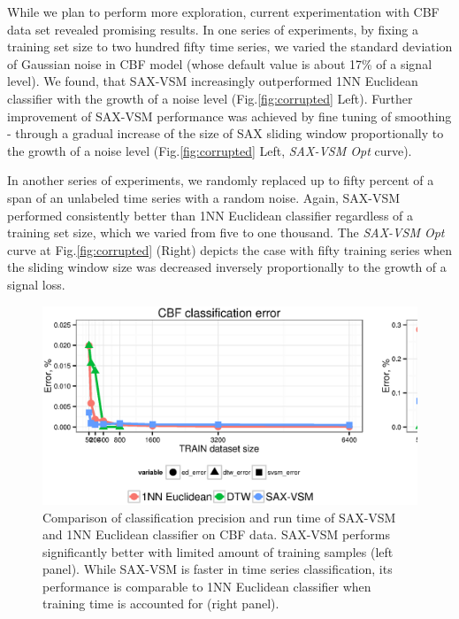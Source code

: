 While we plan to perform more exploration, current experimentation with CBF data set revealed 
promising results. 
In one series of experiments, by fixing a training set size to two hundred fifty time series, we
varied the standard deviation of Gaussian noise in CBF model (whose default value is about 
17\% of a signal level). We found, that SAX-VSM increasingly outperformed 1NN Euclidean classifier 
with the growth of a noise level (Fig.\ref{fig:corrupted} Left). 
Further improvement of SAX-VSM performance was achieved by fine tuning of smoothing - 
through a gradual increase of the size of SAX sliding window proportionally to the growth of 
a noise level (Fig.\ref{fig:corrupted} Left, \textit{SAX-VSM Opt} curve). 

In another series of experiments, we randomly replaced up to fifty percent of a span of an 
unlabeled time series with a random noise. 
Again, SAX-VSM performed consistently better than 1NN Euclidean classifier regardless of a 
training set size, which we varied from five to one thousand. 
The \textit{SAX-VSM Opt} curve at Fig.\ref{fig:corrupted} (Right) depicts the case
with fifty training series when the sliding window size was decreased inversely proportionally 
to the growth of a signal loss.


\begin{figure}[t]
   \centering
   \includegraphics[width=140mm]{figures/precision-synt.ps}
   \caption{Comparison of classification precision and run time of SAX-VSM and 1NN 
   Euclidean classifier on CBF data. SAX-VSM performs significantly better with limited 
   amount of training samples (left panel). While SAX-VSM is faster in time series 
   classification, its performance is comparable to 1NN Euclidean classifier when 
   training time is accounted for (right panel).}
   \label{fig:precision-runtime}
\end{figure}

